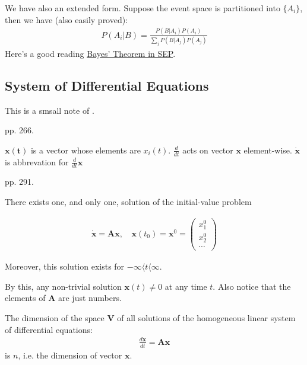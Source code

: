 We have also an extended form. Suppose the event space is partitioned
into $\{A_i\}$, then we have (also easily proved):
\begin{align}
P(A_i|B)=\frac{P(B|A_i)P(A_i)}{\sum_j P(B|A_j)P(A_j)}
\end{align}
Here's a good reading \href{http://plato.stanford.edu/entries/bayes-theorem/}{Bayes' Theorem in SEP}.

\subsection{System of Differential Equations}
This is a smsall note of \cite{DETA}.

pp. 266.

\begin{defi}
   	$\mathbf{x(t)}$ is a vector whose elements are $x_i(t)$.
   	$ \frac{d}{d t}$ acts on vector $\mathbf{x}$ element-wise.
   	$\dot{\mathbf{x}}$ is abbrevation for $\frac{d}{d t}\mathbf{x}$
\end{defi}

pp. 291.

\begin{thm}
   	There exists one, and only one, solution of the initial-value
   	problem
   	
   	\begin{align}
   	\dot{\mathbf{x}}=\mathbf{A}\mathbf{x}\text{, }&
   	\mathbf{x}(t_0) = \mathbf{x}^0 = 
   	\left(
   	\begin{array}{c}
   	x^0_1\\
   	x^0_2\\
   	\cdots
   	\end{array} 
   	\right)
   	\end{align}
   	
   	Moreover, this solution exists for $-\infty\langle t\langle \infty$.
\end{thm}
\begin{remark}
   	By this, any non-trivial solution $\mathbf{x}(t)\neq 0$ at any
   	time $t$. Also notice that the elements of $\mathbf{A}$ are just
   	numbers.
\end{remark}

\begin{thm}
   	The dimension of the space $\mathbf{V}$ of all solutions of the
   	homogeneous linear system of differential equations:
   	\begin{align}
   	\frac{d\mathbf{x}}{dt}=\mathbf{Ax}
   	\end{align}
   	is $n$, i.e. the dimension of vector $\mathbf{x}$.
\end{thm} 
